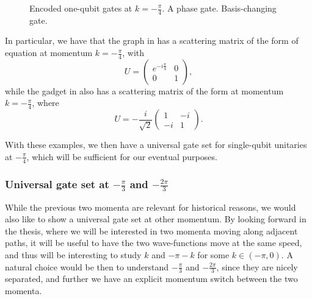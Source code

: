 \documentclass[../thesis-main/thesis-main]{subfiles}
\begin{document}
\begin{figure}
  \centering
  \qquad
   \caption[Universal gadget set at $\frac{\pi}{4}$]{Encoded one-qubit gates at $k = -\frac{\pi}{4}$.    A phase gate.    Basis-changing gate.}
   \label{fig:pi_4_universal}
\end{figure}


In particular, we have that the graph in  has a scattering matrix of the form of equation  at momentum $k= -\frac{\pi}{4}$, with 
\begin{equation}
  U = \begin{pmatrix}
    e^{- i \frac{\pi}{4}} & 0\\
    0 & 1 
  \end{pmatrix},
\end{equation}
while the gadget in  also has a scattering matrix of the form  at momentum $k=-\frac{\pi}{4}$, where
\begin{equation}
  U = -\frac{i}{\sqrt{2}}\begin{pmatrix}
    1 & -i\\
    -i & 1 
  \end{pmatrix}.
\end{equation}



With these examples, we then have a universal gate set for single-qubit unitaries at $-\frac{\pi}{4}$, which will be sufficient for our eventual purposes.  

\subsubsection{Universal gate set at $-\frac{\pi}{3}$ and $-\frac{2\pi}{3}$}

While the previous two momenta are relevant for historical reasons, we would also like to show a universal gate set at other momentum.  By looking forward in the thesis, where we will be interested in two momenta moving along adjacent paths, it will be useful to have the two wave-functions move at the same speed, and thus will be interesting to study $k$ and $-\pi - k$ for some $k\in (-\pi,0)$.  A natural choice would be then to understand $-\frac{\pi}{3}$ and $-\frac{2\pi}{3}$, since they are nicely separated, and further we have an explicit momentum switch between the two momenta.
\end{document}
